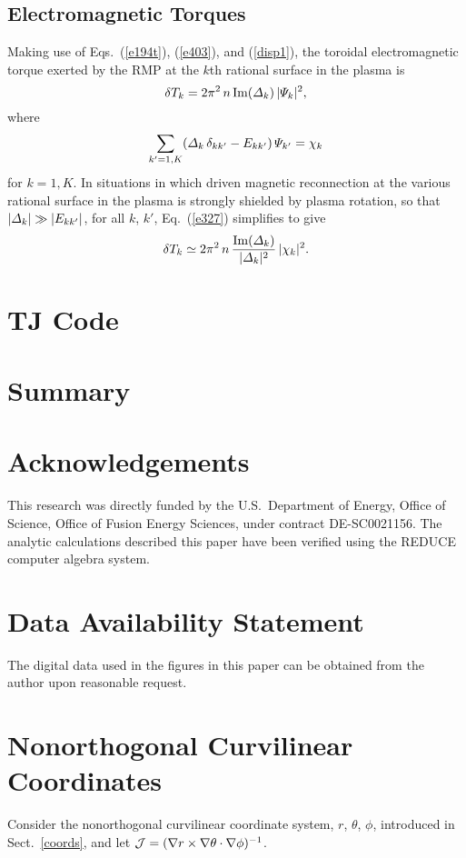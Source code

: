 \documentclass[12pt,prb,aps]{revtex4-1}
\begin{document}
\subsection{Electromagnetic Torques}
Making use of Eqs.~(\ref{e194t}), (\ref{e403}), and (\ref{disp1}),  the toroidal electromagnetic torque exerted by the RMP at the $k$th rational
surface in the plasma is 
\begin{equation}\label{e327}
\delta T_k = 2\pi^2\,n\,{\rm Im}({\mit\Delta}_k)\,|{\mit\Psi}_k|^2,
\end{equation}
where
\begin{equation}
\sum_{k'=1,K}({\mit\Delta}_k\,\delta_{kk'}-E_{kk'})\,{\mit\Psi}_{k'} = \chi_k
\end{equation}
for $k=1,K$. In situations in which driven magnetic reconnection at the various rational surface in the plasma is
strongly shielded by plasma rotation,\cite{am3,rfa} so that $|{\mit\Delta}_k|\gg |E_{kk'}|$, for all $k$, $k'$, Eq.~(\ref{e327}) simplifies to give
\begin{equation}
\delta T_k\simeq 2\pi^2\,n\,\frac{{\rm Im}({\mit\Delta}_k)}{|{\mit\Delta}_k|^2}\,|{\mit\chi}_k|^2.
\end{equation}

\section{TJ Code}\label{tj}

\section{Summary}\label{sum}

\section*{Acknowledgements}
This research was directly funded by the U.S.\ Department of Energy, Office of Science, Office of Fusion Energy Sciences, under  contract DE-SC0021156. 
The analytic calculations  described  this paper have been verified using the {\sc REDUCE} computer algebra system.

\section*{Data Availability Statement}
The digital data used in the figures in this paper can be obtained from the author upon reasonable request.

\appendix
\section{Nonorthogonal Curvilinear Coordinates}\label{s2}
Consider the nonorthogonal curvilinear coordinate system, $r$, $\theta$, $\phi$,  introduced in Sect.~\ref{coords}, and let
${\cal J}=  (\nabla r\times \nabla\theta\cdot\nabla\phi)^{-1}$.
\end{document}
